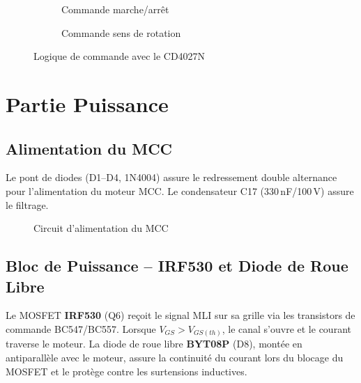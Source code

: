 \documentclass[a4paper,12pt,openany]{book}
\begin{document}
\begin{figure}[H]
  \centering
  \begin{subfigure}[b]{0.45\textwidth}
    \centering
    \caption{Commande marche/arr\^et}
  \end{subfigure}
  \hfill
  \begin{subfigure}[b]{0.45\textwidth}
    \centering
    \caption{Commande sens de rotation}
  \end{subfigure}
  \caption{Logique de commande avec le CD4027N}
  \label{fig:commande}
\end{figure}

\section{Partie Puissance}

\subsection{Alimentation du MCC}

Le pont de diodes (D1--D4, 1N4004) assure le redressement double alternance
pour l'alimentation du moteur MCC. Le condensateur C17 (330\,nF/100\,V)
assure le filtrage.

\begin{figure}[H]
  \centering
  \caption{Circuit d'alimentation du MCC}
  \label{fig:alim_mcc}
\end{figure}

\subsection{Bloc de Puissance -- IRF530 et Diode de Roue Libre}

Le MOSFET \textbf{IRF530} (Q6) re\c coit le signal MLI sur sa grille via
les transistors de commande BC547/BC557. Lorsque $V_{GS} > V_{GS(th)}$,
le canal s'ouvre et le courant traverse le moteur. La diode de roue libre
\textbf{BYT08P} (D8), mont\'ee en antiparall\`ele avec le moteur, assure
la continuit\'e du courant lors du blocage du MOSFET et le prot\`ege contre
les surtensions inductives.
\end{document}
